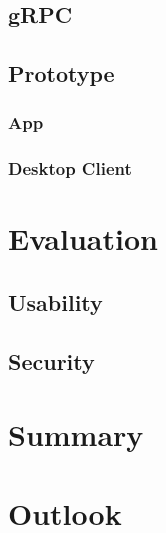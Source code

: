 \documentclass[12pt,twoside,a4paper,parskip]{scrbook}
\begin{document}
\section{gRPC}

\section{Prototype}

\subsection{App}

\subsection{Desktop Client}



\chapter{Evaluation}

\section{Usability}

\section{Security}



\chapter{Summary}

\chapter{Outlook}
\end{document}
